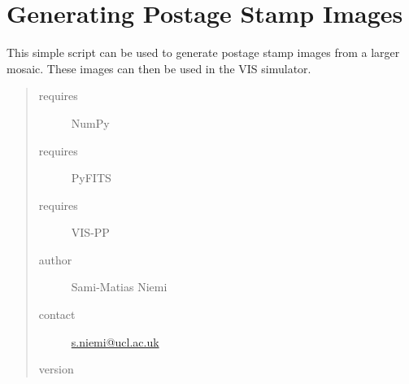 \documentclass[a4paper,11pt,english]{sphinxmanual}
\begin{document}
\label{sources:module-sources.generatePostageStamps}

\section{Generating Postage Stamp Images}
\label{sources:generating-postage-stamp-images}
This simple script can be used to generate postage stamp images from a larger mosaic.
These images can then be used in the VIS simulator.
\begin{quote}\begin{description}
\item[{requires}] \leavevmode
NumPy

\item[{requires}] \leavevmode
PyFITS

\item[{requires}] \leavevmode
VIS-PP

\item[{author}] \leavevmode
Sami-Matias Niemi

\item[{contact}] \leavevmode
\href{mailto:s.niemi@ucl.ac.uk}{s.niemi@ucl.ac.uk}

\item[{version}] 

\end{description}\end{quote}
\end{document}
